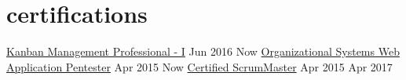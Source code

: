 \documentclass[]{cv} %
\begin{document}

\section{certifications}
\entrysmall
{\href{https://www.iss.nus.edu.sg/ProfessionalCourses/SearchCourse/CourseDetail/tabid/267/cid/399/cname/lean-kanban-foundation/Default.aspx}{Kanban Management Professional - I}}
{Jun 2016 \to Now}
\entrysmall
{\href{http://securitystartshere.org/page-training-oswap.htm}{Organizational Systems Web Application Pentester}}
{Apr 2015 \to Now}
\entrysmall
{\href{https://www.scrumalliance.org/certifications/practitioners/certified-scrummaster-csm}{Certified ScrumMaster}}
{Apr 2015 \to Apr 2017}
\end{document}
